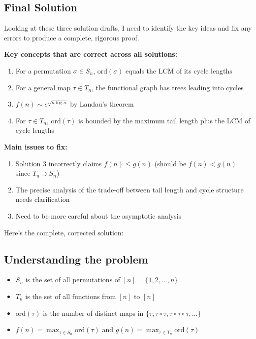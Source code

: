 \documentclass[12pt,a4paper]{article}
\theoremstyle{definition}
\begin{document}
\subsection{Final Solution}
        Looking at these three solution drafts, I need to identify the key ideas and fix any errors to produce a complete, rigorous proof.

        \textbf{Key concepts that are correct across all solutions:}
        \begin{enumerate}
            \item For a permutation $\sigma \in S_n$, $\text{ord}(\sigma)$ equals the LCM of its cycle lengths
            \item For a general map $\tau \in T_n$, the functional graph has trees leading into cycles
            \item $f(n) \sim e^{\sqrt{n \log n}}$ by Landau's theorem
            \item For $\tau \in T_n$, $\text{ord}(\tau)$ is bounded by the maximum tail length plus the LCM of cycle lengths
        \end{enumerate}

        \textbf{Main issues to fix:}
        \begin{enumerate}
            \item Solution 3 incorrectly claims $f(n) \leq g(n)$ (should be $f(n) < g(n)$ since $T_n \supset S_n$)
            \item The precise analysis of the trade-off between tail length and cycle structure needs clarification
            \item Need to be more careful about the asymptotic analysis
        \end{enumerate}

        Here's the complete, corrected solution:

        \subsection*{Understanding the problem}
        \begin{itemize}
            \item $S_n$ is the set of all permutations of $[n] = \{1,2,\ldots,n\}$
            \item $T_n$ is the set of all functions from $[n]$ to $[n]$
            \item $\text{ord}(\tau)$ is the number of distinct maps in $\{\tau, \tau\circ\tau, \tau\circ\tau\circ\tau, \ldots\}$
            \item $f(n) = \max_{\tau\in S_n} \text{ord}(\tau)$ and $g(n) = \max_{\tau\in T_n} \text{ord}(\tau)$
        \end{itemize}
\end{document}
